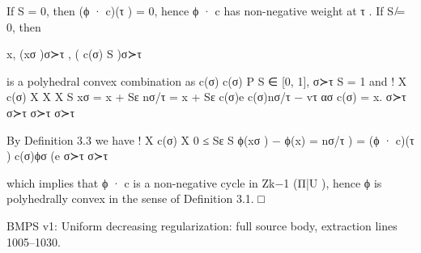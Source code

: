 \documentclass[
  11pt,
]{article}
\newenvironment{Shaded}{}{}
\newcommand{\NormalTok}[1]{#1}
\begin{document}
\begin{Shaded}
\begin{Highlighting}[]
\NormalTok{If S = 0, then (ϕ · c)(τ ) = 0, hence ϕ · c has non{-}negative weight at τ . If S ̸= 0, then}
                                                                    
\NormalTok{                                           x, (xσ )σ≻τ , ( c(σ)}
\NormalTok{                                                            S   )σ≻τ}


\NormalTok{is a polyhedral convex combination as c(σ)                                 c(σ)}
\NormalTok{                                                                  P}
\NormalTok{                                       S ∈ [0, 1],                  σ≻τ     S = 1 and}
\NormalTok{                                                                                                       !}
\NormalTok{          X c(σ)                     X                             X                     X}
\NormalTok{                S   xσ = x + Sε               nσ/τ = x + Sε}
\NormalTok{                                          c(σ)e                          c(σ)nσ/τ − vτ         ασ c(σ)     = x.}
\NormalTok{          σ≻τ                       σ≻τ                            σ≻τ                   σ≻τ}

\NormalTok{By Definition 3.3 we have}
\NormalTok{                                                          !}
\NormalTok{                               X c(σ)                             X}
\NormalTok{                     0 ≤ Sε           S   ϕ(xσ ) − ϕ(x)       =                 nσ/τ ) = (ϕ · c)(τ )}
\NormalTok{                                                                        c(σ)ϕσ (e}
\NormalTok{                               σ≻τ                                σ≻τ}

\NormalTok{which implies that ϕ · c is a non{-}negative cycle in Zk−1 (Π|U ), hence ϕ is polyhedrally convex in the}
\NormalTok{sense of Definition 3.1.                                                                            □}
\end{Highlighting}
\end{Shaded}

BMPS v1: Uniform decreasing regularization: full source body, extraction
lines 1005--1030.
\end{document}
